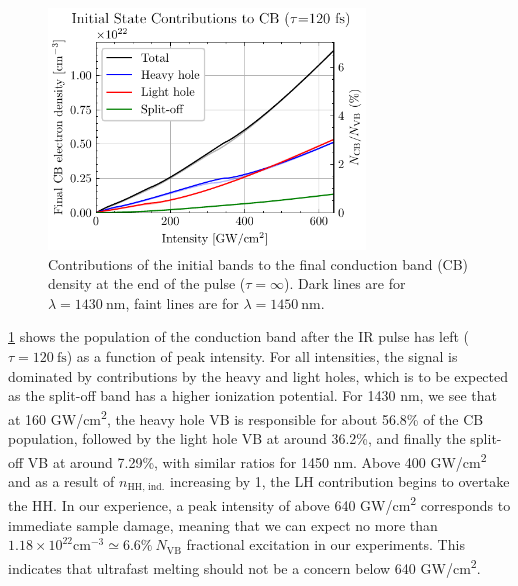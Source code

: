 \begin{figure}
	\centering
	\includegraphics[width=0.75\textwidth]{figures/chap4/CB_dens_vs_Int.pdf}
	\caption{Contributions of the initial bands to the final conduction band (CB) density at the end of the pulse ($\tau = \infty$). Dark lines are for $\lambda = 1430 \ \textrm{nm}$, faint lines are for $\lambda = 1450 \ \textrm{nm}$.}
	\label{fig:CB_dens_vs_Int}
\end{figure}

\cref{fig:CB_dens_vs_Int} shows the population of the conduction band after the IR pulse has left (${\tau = 120 \ \textrm{fs}}$) as a function of peak intensity. For all intensities, the signal is dominated by contributions by the heavy and light holes, which is to be expected as the split-off band has a higher ionization potential. For 1430 nm, we see that at 160 GW/cm\textsuperscript{2}, the heavy hole VB is responsible for about 56.8\% of the CB population, followed by the light hole VB at around 36.2\%, and finally the split-off VB at around 7.29\%, with similar ratios for 1450 nm. Above 400 GW/cm\textsuperscript{2} and as a result of $n_{\textrm{HH, ind.}}$ increasing by 1, the LH contribution begins to overtake the HH. In our experience, a peak intensity of above 640 GW/cm\textsuperscript{2} corresponds to immediate sample damage, meaning that we can expect no more than $1.18 \times 10^{22} \textrm{cm}^{-3} \simeq 6.6\% \ N_{\textrm{VB}}$ fractional excitation in our experiments. This indicates that ultrafast melting should not be a concern below 640 GW/cm\textsuperscript{2}.

